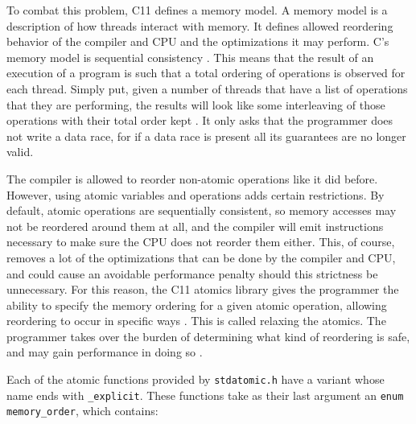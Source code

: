 \documentclass[12pt]{article}
\begin{document}
To combat this problem, C11 defines a memory model.
A memory model is a description of how threads interact with memory. It defines allowed reordering behavior of the compiler and CPU
and the optimizations it may perform. C's memory model is sequential consistency \cite[\S 7.17]{iso-c11}. This means that the result of
an execution of a program is such that a total ordering of operations is observed for each thread. Simply put,
given a number of threads that have a list of operations that they are performing, the results will look like
some interleaving of those operations with their total order kept \cite{c11atomics}. It only asks that the programmer does not
write a data race, for if a data race is present all its guarantees are no longer valid.

The compiler is allowed to reorder non-atomic operations like it did before. However, using atomic
variables and operations adds certain restrictions. By default, atomic operations are sequentially consistent,
so memory accesses may not be reordered around them at all, and the compiler will emit instructions necessary
to make sure the CPU does not reorder them either. This, of course, removes a lot of the optimizations
that can be done by the compiler and CPU, and could cause an avoidable performance penalty should this
strictness be unnecessary. For this reason, the C11 atomics library gives the programmer the ability to
specify the memory ordering for a given atomic operation, allowing reordering to occur in specific ways \cite{iso-c11}.
This is called relaxing the atomics. The programmer takes over the burden of determining what kind of
reordering is safe, and may gain performance in doing so \cite{atomicweapons}.

Each of the atomic functions provided by \texttt{stdatomic.h} have a variant whose name ends with \texttt{\_explicit}.
These functions take as their last argument an \texttt{enum memory\_order}, which contains:
\end{document}
